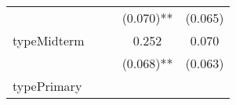 \documentclass[12pt,twoside]{reedthesis}
\begin{document}
\begin{longtable}[]{@{}lcccc@{}}
\begin{minipage}[t]{0.26\columnwidth}
  \strut
  \end{minipage} & \begin{minipage}[t]{0.12\columnwidth}\centering\strut
  \strut
  \end{minipage} & \begin{minipage}[t]{0.14\columnwidth}\centering\strut
  \strut
  \end{minipage} & \begin{minipage}[t]{0.14\columnwidth}\centering\strut
  (0.070)**\strut
  \end{minipage} & \begin{minipage}[t]{0.11\columnwidth}\centering\strut
  (0.065)\strut
  \end{minipage}\tabularnewline
  \begin{minipage}[t]{0.26\columnwidth}\raggedright\strut
  typeMidterm\strut
  \end{minipage} & \begin{minipage}[t]{0.12\columnwidth}\centering\strut
  \strut
  \end{minipage} & \begin{minipage}[t]{0.14\columnwidth}\centering\strut
  \strut
  \end{minipage} & \begin{minipage}[t]{0.14\columnwidth}\centering\strut
  0.252\strut
  \end{minipage} & \begin{minipage}[t]{0.11\columnwidth}\centering\strut
  0.070\strut
  \end{minipage}\tabularnewline
  \begin{minipage}[t]{0.26\columnwidth}\raggedright\strut
  \strut
  \end{minipage} & \begin{minipage}[t]{0.12\columnwidth}\centering\strut
  \strut
  \end{minipage} & \begin{minipage}[t]{0.14\columnwidth}\centering\strut
  \strut
  \end{minipage} & \begin{minipage}[t]{0.14\columnwidth}\centering\strut
  (0.068)**\strut
  \end{minipage} & \begin{minipage}[t]{0.11\columnwidth}\centering\strut
  (0.063)\strut
  \end{minipage}\tabularnewline
  \begin{minipage}[t]{0.26\columnwidth}\raggedright\strut
  typePrimary\strut
  \end{minipage} & \begin{minipage}[t]{0.12\columnwidth}\centering\strut

\end{minipage}
\end{longtable}
\end{document}

